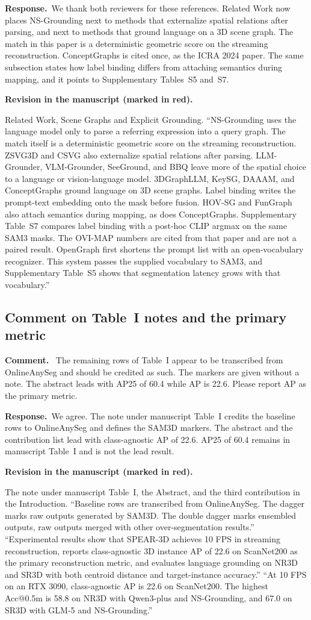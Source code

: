 \documentclass[11pt]{article}
\newcommand{\revcomment}[1]{%
  \par\vspace{0.6em}\noindent\textcolor{revblue}{\textbf{Comment.}}\ %
  \textcolor{revblue}{#1}\par\vspace{0.4em}}
\newcommand{\revresponse}[1]{%
  \par\noindent\textbf{Response.}\ #1\par\vspace{0.3em}}
\newcommand{\revchange}[1]{%
  \par\noindent\textbf{Revision in the manuscript (marked in red).}\par
  \noindent\textcolor{revred}{#1}\par\vspace{0.8em}}
\begin{document}
\revresponse{We thank both reviewers for these references. Related Work now places NS-Grounding next to methods that externalize spatial relations after parsing, and next to methods that ground language on a 3D scene graph. The match in this paper is a deterministic geometric score on the streaming reconstruction. ConceptGraphs is cited once, as the ICRA 2024 paper. The same subsection states how label binding differs from attaching semantics during mapping, and it points to Supplementary Tables~S5 and~S7.}

\revchange{Related Work, Scene Graphs and Explicit Grounding. ``NS-Grounding uses the language model only to parse a referring expression into a query graph. The match itself is a deterministic geometric score on the streaming reconstruction. ZSVG3D and CSVG also externalize spatial relations after parsing. LLM-Grounder, VLM-Grounder, SeeGround, and BBQ leave more of the spatial choice to a language or vision-language model. 3DGraphLLM, KeySG, DAAAM, and ConceptGraphs ground language on 3D scene graphs. Label binding writes the prompt-text embedding onto the mask before fusion. HOV-SG and FunGraph also attach semantics during mapping, as does ConceptGraphs. Supplementary Table~S7 compares label binding with a post-hoc CLIP argmax on the same SAM3 masks. The OVI-MAP numbers are cited from that paper and are not a paired result. OpenGraph first shortens the prompt list with an open-vocabulary recognizer. This system passes the supplied vocabulary to SAM3, and Supplementary Table~S5 shows that segmentation latency grows with that vocabulary.''}

\subsection*{Comment on Table~I notes and the primary metric}

\revcomment{The remaining rows of Table~I appear to be transcribed from OnlineAnySeg and should be credited as such. The markers are given without a note. The abstract leads with AP25 of 60.4 while AP is 22.6. Please report AP as the primary metric.}

\revresponse{We agree. The note under manuscript Table~I credits the baseline rows to OnlineAnySeg and defines the SAM3D markers. The abstract and the contribution list lead with class-agnostic AP of 22.6. AP25 of 60.4 remains in manuscript Table~I and is not the lead result.}

\revchange{The note under manuscript Table~I, the Abstract, and the third contribution in the Introduction. ``Baseline rows are transcribed from OnlineAnySeg. The dagger marks raw outputs generated by SAM3D. The double dagger marks ensembled outputs, raw outputs merged with other over-segmentation results.'' ``Experimental results show that SPEAR-3D achieves 10 FPS in streaming reconstruction, reports class-agnostic 3D instance AP of 22.6 on ScanNet200 as the primary reconstruction metric, and evaluates language grounding on NR3D and SR3D with both centroid distance and target-instance accuracy.'' ``At 10 FPS on an RTX 3090, class-agnostic AP is 22.6 on ScanNet200. The highest Acc@0.5m is 58.8 on NR3D with Qwen3-plus and NS-Grounding, and 67.0 on SR3D with GLM-5 and NS-Grounding.''}
\end{document}

